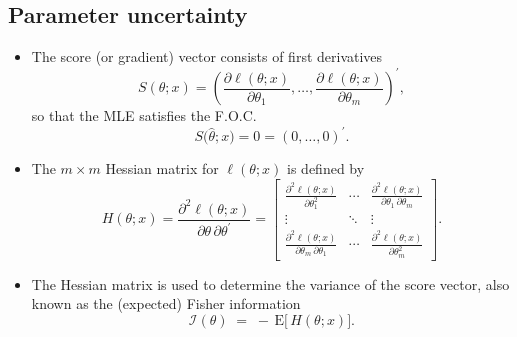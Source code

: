 \documentclass{article}
\begin{document}
\subsection{Parameter uncertainty}

\begin{itemize}
  \item The score (or gradient) vector consists of first derivatives
    \begin{equation*}
      S(\theta; x)
      = \left(
         \frac{\partial \ell(\theta; x)}{\partial \theta_1},
         \dots,
         \frac{\partial \ell(\theta; x)}{\partial \theta_m}
        \right)^\prime,
    \end{equation*}
    so that the MLE satisfies the F.O.C.
    \begin{equation*}
      S\bigl(\widehat\theta; x\bigr)
      = 0 = (0,\dots,0)^\prime.
    \end{equation*}

  \item The $m\times m$ Hessian matrix for $\ell(\theta; x)$ is defined by
    \begin{equation*}
      H(\theta; x)
      = \frac{\partial^2 \ell(\theta; x)}{\partial\theta\,\partial\theta^\prime}
      = 
      \begin{bmatrix}
        \displaystyle\frac{\partial^2 \ell(\theta; x)}{\partial \theta_1^2}
        & \cdots
        & \displaystyle\frac{\partial^2 \ell(\theta; x)}{\partial \theta_1\,\partial \theta_m}
        \\[1em]
        \vdots & \ddots & \vdots \\[0.5em]
        \displaystyle\frac{\partial^2 \ell(\theta; x)}{\partial \theta_m\,\partial \theta_1}
        & \cdots
        & \displaystyle\frac{\partial^2 \ell(\theta; x)}{\partial \theta_m^2}
      \end{bmatrix}.
    \end{equation*}

  \item The Hessian matrix is used to determine the variance of the score vector,
    also known as the (expected) Fisher information
    \begin{equation*}
      \mathcal I(\theta) \;=\; -\,\mathrm{E}\bigl[\,H(\theta; x)\bigr].
    \end{equation*}


\end{itemize}
\end{document}
